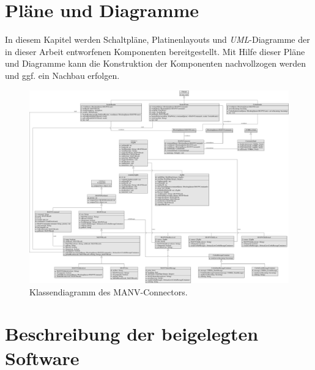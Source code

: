 
\chapter{Pläne und Diagramme}\label{anhang_diagramme}
    In diesem Kapitel werden Schaltpläne, Platinenlayouts und \emph{UML}-Diagramme der in dieser Arbeit 
    entworfenen Komponenten bereitgestellt. Mit Hilfe dieser Pläne und Diagramme kann die Konstruktion 
    der Komponenten nachvollzogen werden und ggf. ein Nachbau erfolgen.

    \begin{figure}
            \includegraphics*[width=1\textwidth]{uml_diagramme/manvconnector_uml.pdf}
            \caption{Klassendiagramm des MANV-Connectors.}
            \label{klassendiagramm_manvconnector}
    \end{figure}

\chapter{Beschreibung der beigelegten Software}\label{anhang_beschreibung_software}

